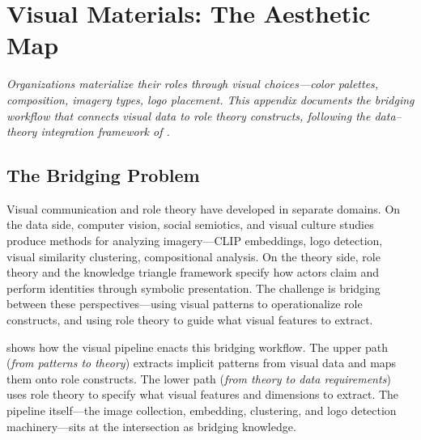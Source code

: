 \documentclass[../main.tex]{subfiles}
\begin{document}

\chapter{Visual Materials: The Aesthetic Map}
\label{app:visual-materials}

\noindent\textit{Organizations materialize their roles through visual choices---color palettes, composition, imagery types, logo placement.
This appendix documents the bridging workflow that connects visual data
to role theory constructs, following the data--theory integration framework
of \textcite{maass2018data}.}

\bigskip


\section{The Bridging Problem}

Visual communication and role theory have developed in separate domains.
On the data side, computer vision, social semiotics, and visual culture
studies produce methods for analyzing imagery---CLIP embeddings, logo detection,
visual similarity clustering, compositional analysis.
On the theory side, role theory and the knowledge triangle framework specify
how actors claim and perform identities through symbolic presentation.
The challenge is bridging between these perspectives---using
visual patterns to operationalize role constructs, and using
role theory to guide what visual features to extract.

 shows how the \RoleBox{} visual pipeline
enacts this bridging workflow.
The upper path (\textit{from patterns to theory}) extracts implicit
patterns from visual data and maps them onto role constructs.
The lower path (\textit{from theory to data requirements}) uses role
theory to specify what visual features and dimensions to extract.
The pipeline itself---the image collection, embedding, clustering, and
logo detection machinery---sits at the intersection as bridging knowledge.
\end{document}

